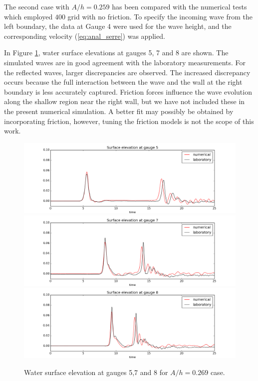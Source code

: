\documentclass[review]{elsarticle}
\begin{document}
The second case with $A/h=0.259$ has been 
compared with the numerical tests
which employed $400$ grid with no friction. 
To specify the incoming wave from the left boundary, 
the data at Gauge 4 were used for the wave height,
and the corresponding velocity (\ref{eq:anal_serre})
was applied.

In Figure \ref{fig:bp5b_gauges}, water surface elevations at gauges 5, 7 and 8 are shown. 
The simulated waves are in good agreement with the laboratory measurements. 
For the reflected waves, larger discrepancies are observed.
The increased discrepancy occurs because the full interaction between the wave and the wall
at the right boundary is less accurately captured.
Friction forces influence the wave evolution along the shallow region near the right wall,
but we have not included these in the present numerical simulation.
A better fit may possibly be obtained by incorporating friction, however,
tuning the friction models is not the scope of this work. 

\begin{figure}[!htb]
\centering
\includegraphics[width=.8\textwidth]{_fig/gauge0005fig300.png}\\
\includegraphics[width=.8\textwidth]{_fig/gauge0007fig300.png}\\
\includegraphics[width=.8\textwidth]{_fig/gauge0008fig300.png}
\caption{Water surface elevation at gauges 5,7 and 8 for $A/h=0.269$ case.}
\label{fig:bp5b_gauges}
\end{figure}
\end{document}
